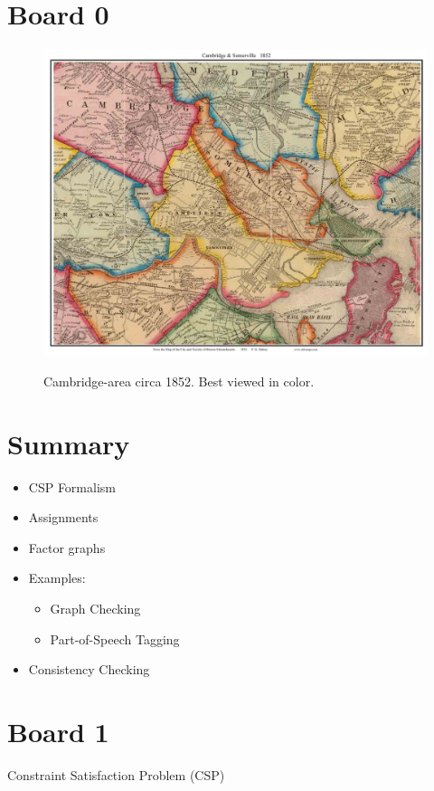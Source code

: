 \documentclass[10pt]{article}
\begin{document}
\MakeScribeTop{}

\section{Board 0}

\begin{figure}[h]
  \centering
  \includegraphics[width=0.8\linewidth]{../pics/CambridgeSomerville_1852_web}
  \label{fig:camb}
  \caption{Cambridge-area circa 1852. Best viewed in color.}
\end{figure}

\section{Summary}

\begin{itemize}
\item CSP Formalism
\item Assignments 
\item Factor graphs
\item Examples:
  \begin{itemize}
  \item Graph Checking
  \item Part-of-Speech Tagging
  \end{itemize}
\item Consistency Checking
\end{itemize}

\section{Board 1}

Constraint Satisfaction Problem (CSP)
\end{document}
